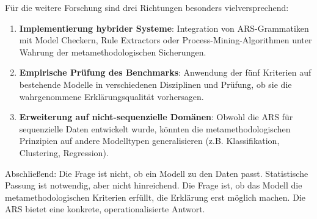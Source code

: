 \documentclass[12pt,a4paper]{article}
\begin{document}
Für die weitere Forschung sind drei Richtungen besonders vielversprechend:

\begin{enumerate}
    \item \textbf{Implementierung hybrider Systeme}: Integration von 
    ARS-Grammatiken mit Model Checkern, Rule Extractors oder Process-Mining-Algorithmen 
    unter Wahrung der metamethodologischen Sicherungen.
    
    \item \textbf{Empirische Prüfung des Benchmarks}: Anwendung der fünf 
    Kriterien auf bestehende Modelle in verschiedenen Disziplinen und 
    Prüfung, ob sie die wahrgenommene Erklärungsqualität vorhersagen.
    
    \item \textbf{Erweiterung auf nicht-sequenzielle Domänen}: Obwohl die 
    ARS für sequenzielle Daten entwickelt wurde, könnten die metamethodologischen 
    Prinzipien auf andere Modelltypen generalisieren (z.B. Klassifikation, 
    Clustering, Regression).
\end{enumerate}

Abschließend: Die Frage ist nicht, ob ein Modell zu den Daten passt. 
Statistische Passung ist notwendig, aber nicht hinreichend. Die Frage ist, 
ob das Modell die metamethodologischen Kriterien erfüllt, die Erklärung 
erst möglich machen. Die ARS bietet eine konkrete, operationalisierte 
Antwort.
\end{document}
